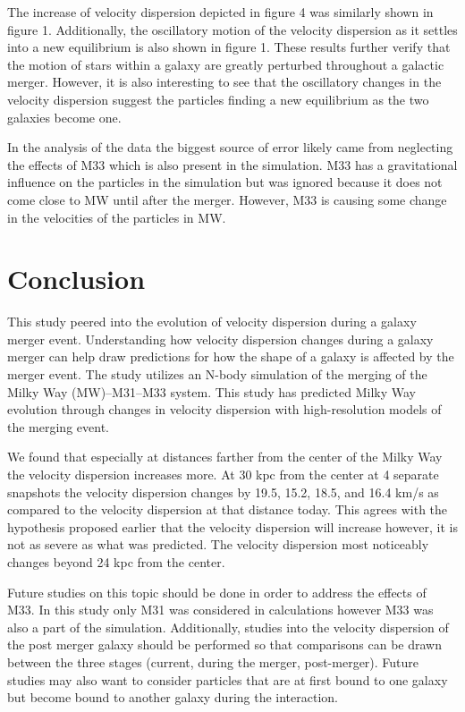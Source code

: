 \documentclass[fleqn,usenatbib]{mnras}
\begin{document}
The increase of velocity dispersion depicted in figure 4 was similarly shown in figure 1. \cite{Stickley_2012} Additionally, the oscillatory motion of the velocity dispersion as it settles into a new equilibrium is also shown in figure 1. \cite{Stickley_2012} These results further verify that the motion of stars within a galaxy are greatly perturbed throughout a galactic merger. However, it is also interesting to see that the oscillatory changes in the velocity dispersion suggest the particles finding a new equilibrium as the two galaxies become one.

In the analysis of the data the biggest source of error likely came from neglecting the effects of M33 which is also present in the simulation. M33 has a gravitational influence on the particles in the simulation but was ignored because it does not come close to MW until after the merger. However, M33 is causing some change in the velocities of the particles in MW.

\section{Conclusion}

This study peered into the evolution of velocity dispersion during a galaxy merger event. Understanding how velocity dispersion changes during a galaxy merger can help draw predictions for how the shape of a galaxy is affected by the merger event. The study utilizes an N-body
simulation of the merging of the Milky Way (MW)–M31–M33 system. This study has predicted Milky Way evolution through changes in velocity dispersion with high-resolution models of the merging event.

We found that especially at distances farther from the center of the Milky Way the velocity dispersion increases more. At 30 kpc from the center at 4 separate snapshots the velocity dispersion changes by 19.5, 15.2, 18.5, and 16.4 km/s as compared to the velocity dispersion at that distance today. This agrees with the hypothesis proposed earlier that the velocity dispersion will increase however, it is not as severe as what was predicted. The velocity dispersion most noticeably changes beyond 24 kpc from the center.

Future studies on this topic should be done in order to address the effects of M33. In this study only M31 was considered in calculations however M33 was also a part of the simulation. Additionally, studies into the velocity dispersion of the post merger galaxy should be performed so that comparisons can be drawn between the three stages (current, during the merger, post-merger). Future studies may also want to consider particles that are at first bound to one galaxy but become bound to another galaxy during the interaction.
\end{document}
